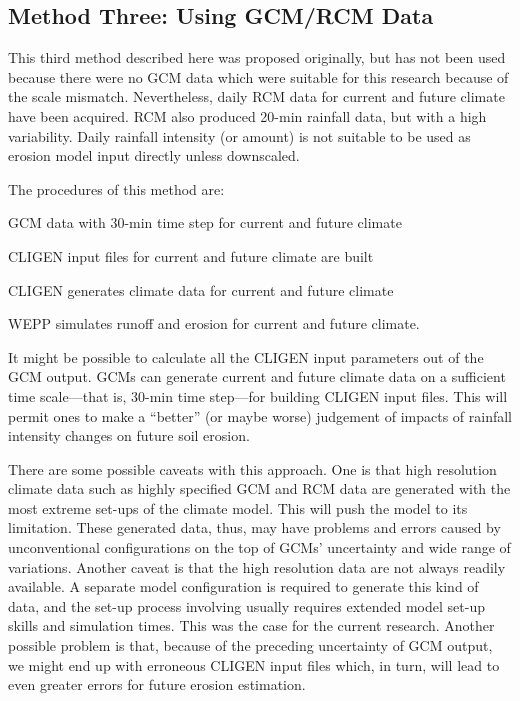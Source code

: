 \subsection{Method Three: Using GCM/RCM Data}
\label{sec:MethodThree}

This third method described here was proposed originally, but has not been used
because there were no GCM data which were suitable for this research because of
the scale mismatch.
Nevertheless, daily RCM data for current and future climate have been acquired.
RCM also produced 20-min rainfall data, but with a high variability. Daily
rainfall intensity (or amount) is not suitable to be used as erosion model input
directly unless downscaled.

The procedures of this method are:
\begin{enumerate*}
  \item GCM data with 30-min time step for current and future climate
  \item CLIGEN input files for current and future climate are built
  \item CLIGEN generates climate data for current and future climate
  \item WEPP simulates runoff and erosion for current and future climate.
\end{enumerate*}

It might be possible to calculate all the CLIGEN input parameters out of the GCM
output. GCMs can generate current and future climate data on a sufficient time
scale---that is, 30-min time step---for building CLIGEN input files. This will
permit ones to make a ``better'' (or maybe worse) judgement of impacts of
rainfall intensity changes on future soil erosion.

There are some possible caveats with this approach. One is that high resolution
climate data such as highly specified GCM and RCM data are generated with the
most extreme set-ups of the climate model. This will push the model to its
limitation. These generated data, thus, may have problems and errors caused by
unconventional configurations on the top of GCMs' uncertainty and wide range of
variations. Another caveat is that the high resolution data are not always
readily available. A separate model configuration is required to generate this
kind of data, and the set-up process involving usually requires extended model
set-up skills and simulation times. This was the case for the current research.
Another possible problem is that, because of the preceding uncertainty of GCM
output, we might end up with erroneous CLIGEN input files which, in turn, will
lead to even greater errors for future erosion estimation.

